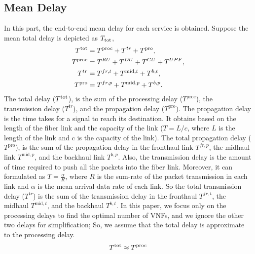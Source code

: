\documentclass[conference]{IEEEtran}
\begin{document}
\subsection{Mean Delay}
In this part, the end-to-end mean delay for each service is obtained.
Suppose the mean total delay is depicted as $T_{\text{\text{tot}}}$,
\begin{equation}
\begin{split}
T^{\text{\text{tot}}} &=  T^{\text{proc}} + T^{tr} + T^{\text{pro}},\\
T^{\text{\text{proc}}} &=  T^{RU} + T^{DU} + T^{CU} + T^{UPF},\\
T^{tr} &= T^{fr,t} + T^{\text{mid},t} + T^{b,t},  \\
T^{\text{pro}} &= T^{fr,p} + T^{\text{mid},p} + T^{b,p}.  \\
\end{split}
\end{equation}
The total delay ($T^{\text{\text{tot}}}$), is the sum of the processing delay ($T^{\text{proc}}$), the transmission delay ($T^{tr}$), and the propagation delay ($T^{\text{pro}}$). 
The propagation delay is the time takes for a signal to reach its destination. It obtains based on the length of the fiber link and the capacity of the link ($T = L/c$, where $L$ is the length of the link and c is the capacity of the link). The total propagation delay ($T^{\text{pro}}$), is the sum of the propagation delay in the fronthaul link $T^{fr,p}$, the midhaul link $T^{\text{mid},p}$, and the backhaul link $T^{b,p}$.
Also, the transmission delay is the amount of time required to push all the packets into the fiber link.
Moreover, it can formulated as 
$T = \frac{\mathcal{\alpha}}{R}$, where $R$ is the sum-rate of the packet transmission in each link and $\mathcal{\alpha}$ is the mean arrival data rate of each link.
So the total transmission delay ($T^{tr}$) is the sum of the transmission delay in the fronthaul $T^{fr,t}$, the midhaul $T^{\text{mid},t}$, and the backhaul $T^{b,t}$.
In this paper, we focus only on the processing delays to find the optimal number of VNFs, and we ignore the other two delays for simplification;
So, we assume that the total delay is approximate to the processing delay.
\begin{equation}
T^{\text{\text{tot}}} \approx T^{\text{proc}}
\end{equation}
\end{document}
